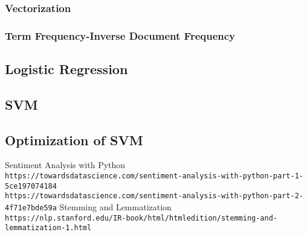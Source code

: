 \documentclass[11pt, a4paper, twocolumn]{article}
\begin{document}
\subsubsection{Vectorization}
\subsubsection{Term Frequency-Inverse Document Frequency}

\subsection{Logistic Regression}

\subsection{SVM}

\subsection{Optimization of SVM}

\begin{thebibliography}{9}
		Sentiment Analysis with Python
		\\\texttt{https://towardsdatascience.com/sentiment-analysis-with-python-part-1-5ce197074184}
		\\\texttt{https://towardsdatascience.com/sentiment-analysis-with-python-part-2-4f71e7bde59a}
		Stemming and Lemmatization
		\\\texttt{https://nlp.stanford.edu/IR-book/html/htmledition/stemming-and-lemmatization-1.html}

\end{thebibliography}
\end{document}

